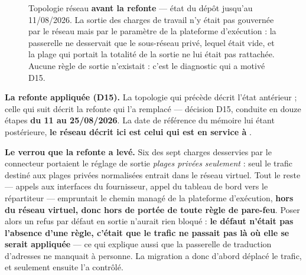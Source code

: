 \begin{figure}[htbp]
\caption[Topologie réseau avant la refonte]{Topologie réseau \textbf{avant la refonte} --- état du
dépôt jusqu'au 11/08/2026. La sortie des charges de travail n'y était pas gouvernée par le réseau
mais par le paramètre de la plateforme d'exécution : la passerelle ne desservait que le sous-réseau
privé, lequel était vide, et la plage qui portait la totalité de la sortie ne lui était pas
rattachée. Aucune règle de sortie n'existait : c'est le diagnostic qui a motivé D15.}
\label{fig:topologie-reseau}
\end{figure}

\medskip
\noindent\textbf{La refonte appliquée (D15).}
\label{subsec:reseau-cible}
La topologie qui précède décrit l'état antérieur ; celle qui suit décrit la refonte qui l'a
remplacé --- décision D15, conduite en douze étapes \textbf{du 11 au 25/08/2026}. La date de référence du
mémoire lui étant postérieure, \textbf{le réseau décrit ici est celui qui est en service à
\dateref}.

\medskip
\noindent\textbf{Le verrou que la refonte a levé.}
Six des sept charges desservies par le connecteur portaient le réglage de sortie \emph{plages
privées seulement} : seul le trafic destiné aux plages privées normalisées entrait dans le réseau
virtuel. Tout le reste --- appels aux interfaces du fournisseur, appel du tableau de bord vers le
répartiteur --- empruntait le chemin managé de la plateforme d'exécution, \textbf{hors du réseau
virtuel, donc hors de portée de toute règle de pare-feu}. Poser alors un refus par défaut en sortie
n'aurait rien bloqué : \textbf{le défaut n'était pas l'absence d'une règle, c'était que le trafic
ne passait pas là où elle se serait appliquée} --- ce qui explique aussi que la passerelle de
traduction d'adresses ne manquait à personne. La migration a donc d'abord déplacé le trafic, et
seulement ensuite l'a contrôlé.


